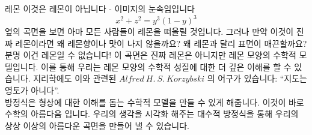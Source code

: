 ﻿\begin{surferPage}{레몬}
이것은 레몬이 아닙니다 - 이미지의 눈속임입니다\\
\smallskip
\[x^2 + z^2 = y^3 (1 - y)^3\] 
\singlespacing
옆의 곡면을 보면 아마 모든 사람들이 레몬을 떠올릴 것입니다. 그러나 만약 이것이 진짜 레몬이라면 왜 레몬향이나 맛이 나지 않을까요? 왜 레몬과 달리 표면이 매끈할까요? 분명 이건 레몬일 수 없습니다! 
\singlespacing
이 곡면은 진짜 레몬은 아니지만 레몬 모양의 수학적 모델입니다.  이를 통해 우리는 레몬 모양의 수학적 성질에 대한 더 깊은 이해를 할 수 있습니다. 지리학에도 이와 관련된 $Alfred\ H.\ S.\ Korzybski$ 의 어구가 있습니다: \enquote{지도는 영토가 아니다}. \\
\singlespacing
방정식은 형상에 대한 이해를 돕는 수학적 모델을 만들 수 있게 해줍니다. 
\singlespacing
이것이 바로 수학의 아름다움 입니다. 우리의 생각을 시각화 해주는 대수적 방정식을 통해 우리의 상상 이상의 아름다운 곡면을 만들어 낼 수 있습니다.
\end{surferPage}
